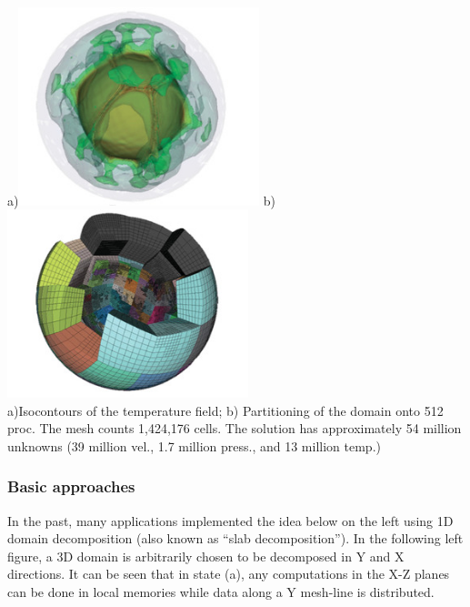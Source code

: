 \begin{center}
a)\includegraphics[width=7cm]{images/parallel/krhb2}
b)\includegraphics[width=7cm]{images/parallel/krhb1} \\
{\captionfont a)Isocontours of the temperature field; b) Partitioning of the domain onto 512 proc. 
The mesh counts 1,424,176 cells. The solution has approximately 54 million unknowns 
(39 million vel., 1.7 million press., and 13 million temp.)
}
\end{center}

\subsubsection{Basic approaches}

In the past, many applications implemented the idea below on the left using 1D domain decomposition 
(also known as ``slab decomposition''). In the following left figure, 
a 3D domain is arbitrarily chosen to be decomposed in Y and X directions. 
It can be seen that in state (a), any computations in the X-Z planes can be done in local memories 
while data along a Y mesh-line is distributed. 


